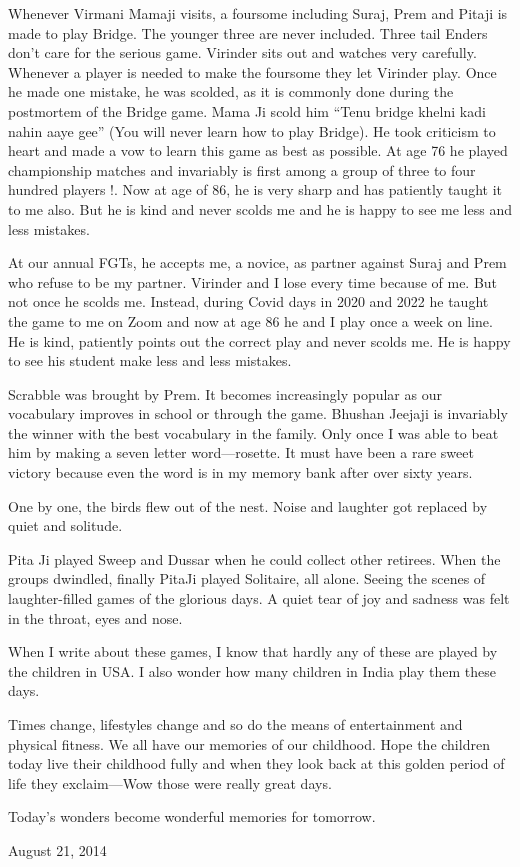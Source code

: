 Whenever Virmani Mamaji visits, a foursome including Suraj, Prem and
Pitaji is made to play Bridge. The younger three are never included. Three
tail Enders don’t care for the serious game. Virinder sits out and watches
very carefully. Whenever a player is needed to make the foursome they let
Virinder play. Once he made one mistake, he was scolded, as it is commonly
done during the postmortem of the Bridge game. Mama Ji scold him “Tenu
bridge khelni kadi nahin aaye gee” (You will never learn how to play
Bridge). He took criticism to heart and made a vow to learn this game as
best as possible. At age 76 he played championship matches and invariably
is first among a group of three to four hundred players !. Now at age of
86, he is very sharp and has patiently taught it to me also. But he is
kind and never scolds me and he is happy to see me less and less mistakes.

At our annual FGTs, he accepts me, a novice, as partner against Suraj and
Prem who refuse to be my partner. Virinder and I lose every time because
of me. But not once he scolds me. Instead, during Covid days in 2020 and
2022 he taught the game to me on Zoom and now at age 86 he and I play once
a week on line. He is kind, patiently points out the correct play and
never scolds me. He is happy to see his student make less and less
mistakes.

Scrabble was brought by Prem. It becomes increasingly popular as our
vocabulary improves in school or through the game. Bhushan Jeejaji is
invariably the winner with the best vocabulary in the family. Only once
I was able to beat him by making a seven letter word—rosette. It must have
been a rare sweet victory because even the word is in my memory bank after
over sixty years. 

One by one, the birds flew out of the nest. Noise and laughter got
replaced by quiet and solitude. 

Pita Ji played Sweep and Dussar when he could collect other retirees. When
the groups dwindled, finally PitaJi played Solitaire, all alone. Seeing
the scenes of laughter-filled games of the glorious days. A quiet tear of
joy and sadness was felt in the throat, eyes and nose. 

When I write about these games, I know that hardly any of these are played
by the children in USA. I also wonder how many children in India play them
these days. 

Times change, lifestyles change and so do the means of entertainment and
physical fitness. We all have our memories of our childhood. Hope the
children today live their childhood fully and when they look back at this
golden period of life they exclaim—Wow those were really great days. 

Today's wonders become wonderful memories for tomorrow. 

August 21, 2014

